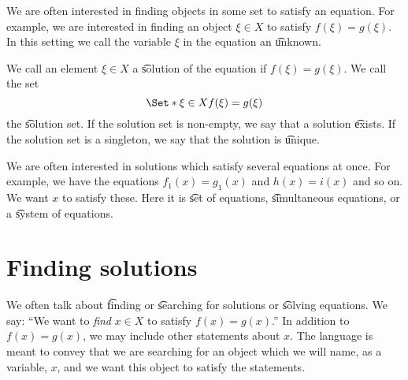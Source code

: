 We are often interested in finding objects in some set to satisfy an equation.
For example, we are interested in finding an object $\xi  \in X$ to satisfy $f(\xi ) = g(\xi )$.
In this setting we call the variable $\xi $ in the equation an \t{unknown}.

We call an element $\xi  \in X$ a \t{solution} of the equation if $f(\xi ) = g(\xi )$.
We call the set
\[
\Set*{\xi  \in X}{f(\xi ) = g(\xi )}
\]
the \t{solution set}.
If the solution set is non-empty, we say that a solution \t{exists}.
If the solution set is a singleton, we say that the solution is \t{unique}.

We are often interested in solutions which satisfy several equations at once.
For example, we have the equations $f_1(x) = g_1(x)$ and $h(x) = i(x)$ and so on.
We want $x$ to satisfy these.
Here it is \t{set of equations}, \t{simultaneous equations}, or a \t{system of equations}.

\section*{Finding solutions}

We often talk about \t{finding} or \t{searching} for solutions or \t{solving equations}.
We say: ``We want to \textit{find} $x \in X$ to satisfy $f(x) = g(x)$.''
In addition to $f(x) = g(x)$, we may include other statements about $x$.
The language is meant to convey that we are searching for an object which we will name, as a variable, $x$, and we want this object to satisfy the statements.
